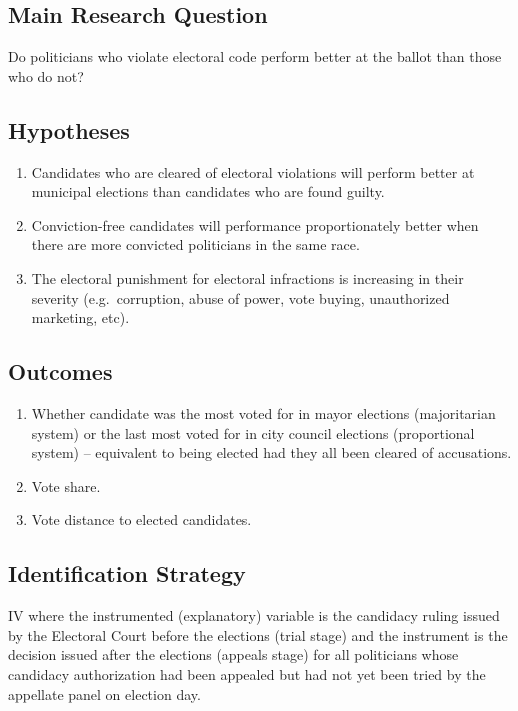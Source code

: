 \documentclass[]{article}
\begin{document}
\hypertarget{main-research-question}{%
\subsection{Main Research Question}\label{main-research-question}}

Do politicians who violate electoral code perform better at the ballot
than those who do not?

\hypertarget{hypotheses}{%
\subsection{Hypotheses}\label{hypotheses}}

\begin{enumerate}
\item
  Candidates who are cleared of electoral violations will perform better
  at municipal elections than candidates who are found guilty.
\item
  Conviction-free candidates will performance proportionately better
  when there are more convicted politicians in the same race.
\item
  The electoral punishment for electoral infractions is increasing in
  their severity (e.g.~corruption, abuse of power, vote buying,
  unauthorized marketing, etc).
\end{enumerate}

\hypertarget{outcomes}{%
\subsection{Outcomes}\label{outcomes}}

\begin{enumerate}
\item
  Whether candidate was the most voted for in mayor elections
  (majoritarian system) or the last most voted for in city council
  elections (proportional system) -- equivalent to being elected had
  they all been cleared of accusations.
\item
  Vote share.
\item
  Vote distance to elected candidates.
\end{enumerate}

\hypertarget{identification-strategy}{%
\subsection{Identification Strategy}\label{identification-strategy}}

IV where the instrumented (explanatory) variable is the candidacy ruling
issued by the Electoral Court before the elections (trial stage) and the
instrument is the decision issued after the elections (appeals stage)
for all politicians whose candidacy authorization had been appealed but
had not yet been tried by the appellate panel on election day.
\end{document}
